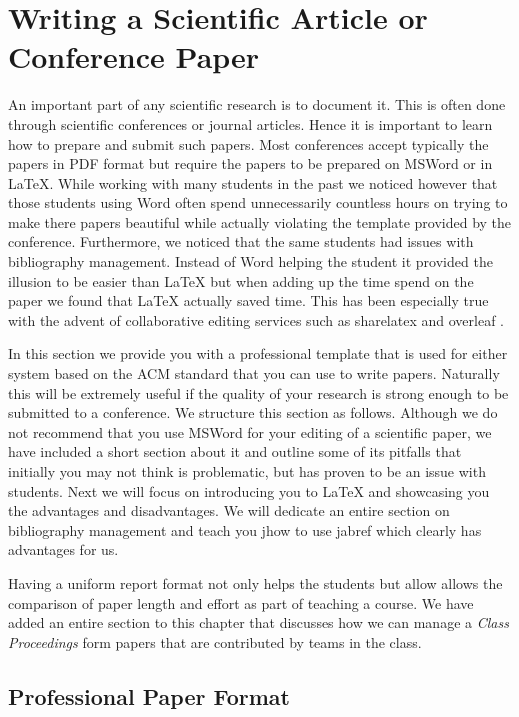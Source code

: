 \FILENAME

\section{Writing a Scientific Article or Conference Paper}
\label{S:writing}

An important part of any scientific research is to document it. This is
often done through scientific conferences or journal articles. Hence it
is important to learn how to prepare and submit such papers. Most
conferences accept typically the papers in PDF format but require the
papers to be prepared on MSWord or in LaTeX. While working with many
students in the past we noticed however that those students using Word
often spend unnecessarily countless hours on trying to make there papers
beautiful while actually violating the template provided by the
conference. Furthermore, we noticed that the same students had issues
with bibliography management. Instead of Word helping the student it
provided the illusion to be easier than LaTeX but when adding up the
time spend on the paper we found that LaTeX actually saved time. This
has been especially true with the advent of collaborative editing
services such as sharelatex \cite{www-sharelatex} and overleaf
\cite{www-overleaf}. 

In this section we provide you with a professional template that is used
for either system based on the ACM standard that you can use to write
papers. Naturally this will be extremely useful if the quality of your
research is strong enough to be submitted to a conference. We structure
this section as follows. Although we do not recommend that you use
MSWord for your editing of a scientific paper, we have included a short
section about it and outline some of its pitfalls that initially you may
not think is problematic, but has proven to be an issue with students.
Next we will focus on introducing you to LaTeX and showcasing you the
advantages and disadvantages. We will dedicate an entire section on
bibliography management and teach you jhow to use jabref which clearly
has advantages for us.

Having a uniform report format not only helps the students but allow
allows the comparison of paper length and effort as part of teaching a
course. We have added an entire section to this chapter that discusses
how we can manage a \emph{Class Proceedings} form papers that are
contributed by teams in the class.

\subsection{Professional Paper Format}\label{professional-paper-format}

